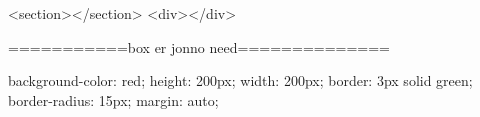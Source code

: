 


<section></section>
<div></div>





===========box er jonno need==============

background-color: red;
height: 200px;
width: 200px;
border: 3px solid green;
border-radius: 15px;
margin: auto;
